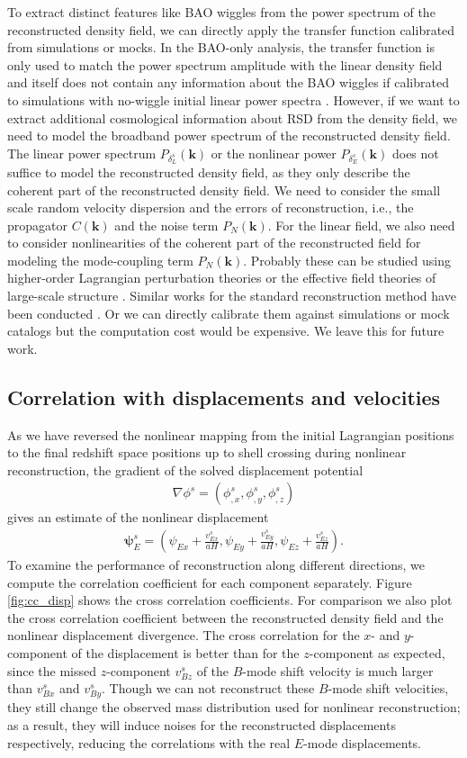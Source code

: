 \documentclass[aps,prx,twocolumn,superscriptaddress,groupedaddress,nofootinbib,amsfont]{revtex4}  %
\newcommand{\bea}{\begin{eqnarray}}
\newcommand{\eea}{\end{eqnarray}}
\newcommand{\bmp}{\bm{\psi}}
\newcommand{\bmk}{\bm{k}}
\begin{document}
To extract distinct features like BAO wiggles from the power spectrum of the
reconstructed density field, we can directly apply the transfer function 
calibrated from simulations or mocks. 
In the BAO-only analysis, the transfer function is only used to match the power 
spectrum amplitude with the linear density field and itself does not contain any
information about the BAO wiggles if calibrated to simulations with 
no-wiggle initial linear power spectra \cite{2017Marcel}.
However, if we want to extract additional cosmological information about RSD 
from the density field, we need to model the broadband power spectrum of the
reconstructed density field. 
The linear power spectrum $P_{\delta_L^s}(\bmk)$ or the nonlinear power $P_{\delta_E^s}(\bmk)$ does not suffice to model the reconstructed density field, as 
they only describe the coherent part of the reconstructed density field. 
We need to consider the small scale random velocity dispersion and the errors of
reconstruction, i.e., the propagator $C(\bmk)$ and the noise term $P_N(\bmk)$.
For the linear field, we also need to consider nonlinearities of the coherent 
part of the reconstructed field for modeling the mode-coupling term $P_N(\bmk)$.
Probably these can be studied using higher-order Lagrangian perturbation theories or the effective field theories of large-scale structure \cite{2016BSZ}.
Similar works for the standard reconstruction method have been conducted \cite{2009PWC,2009NWP,2015marcel,2015Martin,2016Seo,2017CKA}.
Or we can directly calibrate them against simulations or mock catalogs but the
computation cost would be expensive. We leave this for future work.


\subsection{Correlation with displacements and velocities}

As we have reversed the nonlinear mapping from the initial Lagrangian positions
to the final redshift space positions up to shell crossing during nonlinear 
reconstruction, the gradient of the solved displacement potential 
\bea
\nabla\phi^s=(\phi_{,x}^s,\phi_{,y}^s,\phi_{,z}^s)
\eea
gives an estimate of the nonlinear displacement
\bea
\bmp_E^s=(\psi_{Ex}+\frac{v_{Ex}^s}{aH},\psi_{Ey}+\frac{v_{Ey}^s}{aH},\psi_{Ez}+\frac{v_{Ez}^s}{aH}).
\eea
To examine the performance of reconstruction along different directions, we 
compute the correlation coefficient for each component separately. 
Figure \ref{fig:cc_disp} shows the cross correlation coefficients. 
For comparison we also plot the cross correlation coefficient between the 
reconstructed density field and the nonlinear displacement divergence.
The cross correlation for the $x$- and $y$-component of the displacement is
better than for the $z$-component as expected, since the missed $z$-component 
$v_{Bz}^s$ of the $B$-mode shift velocity is much larger than $v_{Bx}^s$ and 
$v_{By}^s$. Though we can not reconstruct these $B$-mode shift velocities, they
still change the observed mass distribution used for nonlinear reconstruction; 
as a result, they will induce noises for the reconstructed displacements 
respectively, reducing the correlations with the real $E$-mode displacements. 
\end{document}
